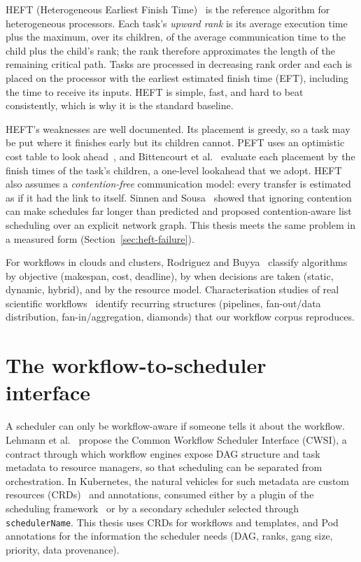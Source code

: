 \documentclass[12pt,a4paper]{report}
\begin{document}
HEFT (Heterogeneous Earliest Finish Time)~\cite{topcuoglu2002heft} is the
reference algorithm for heterogeneous processors. Each task's
\emph{upward rank} is its average execution time plus the maximum, over its
children, of the average communication time to the child plus the child's
rank; the rank therefore approximates the length of the remaining
critical path. Tasks are processed in decreasing rank order and each is
placed on the processor with the earliest estimated finish time (EFT),
including the time to receive its inputs. HEFT is simple, fast, and hard
to beat consistently, which is why it is the standard baseline.

HEFT's weaknesses are well documented. Its placement is greedy, so a
task may be put where it finishes early but its children cannot. PEFT
uses an optimistic cost table to look ahead~\cite{arabnejad2014peft},
and Bittencourt et al.~\cite{bittencourt2010lookahead} evaluate each
placement by the finish times of the task's children, a one-level
lookahead that we adopt. HEFT also assumes a \emph{contention-free}
communication model: every transfer is estimated as if it had the link to
itself. Sinnen and Sousa~\cite{sinnen2005contention} showed that ignoring
contention can make schedules far longer than predicted and proposed
contention-aware list scheduling over an explicit network graph. This
thesis meets the same problem in a measured form
(Section~\ref{sec:heft-failure}).

For workflows in clouds and clusters, Rodriguez and
Buyya~\cite{rodriguez2017taxonomy} classify algorithms by objective
(makespan, cost, deadline), by when decisions are taken (static,
dynamic, hybrid), and by the resource model. Characterisation studies of
real scientific workflows~\cite{bharathi2008characterization,
juve2013characterizing} identify recurring structures (pipelines,
fan-out/data distribution, fan-in/aggregation, diamonds) that our
workflow corpus reproduces.

\section{The workflow-to-scheduler interface}

A scheduler can only be workflow-aware if someone tells it about the
workflow. Lehmann et al.~\cite{lehmann2023cwsi,lehmann2023status}
propose the Common Workflow Scheduler Interface (CWSI), a contract through
which workflow engines expose DAG structure and task metadata to resource
managers, so that scheduling can be separated from orchestration. In
Kubernetes, the natural vehicles for such metadata are custom resources
(CRDs)~\cite{kubernetes-crd} and annotations, consumed either by a plugin
of the scheduling framework~\cite{kubernetes-framework} or by a
secondary scheduler selected through \texttt{schedulerName}. This thesis
uses CRDs for workflows and templates, and Pod annotations for the
information the scheduler needs (DAG, ranks, gang size, priority, data
provenance).
\end{document}

